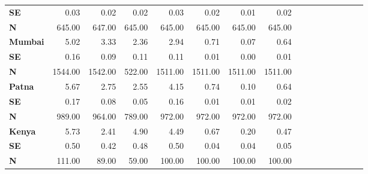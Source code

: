 \begin{tabular}{@{\extracolsep{5pt}}lrrrrrrrrrrrrrrr}
{\bf SE} & 0.03\phantom{***} & 0.02\phantom{***} & 0.02\phantom{***} & 0.03\phantom{***} & 0.02\phantom{***} & 0.01\phantom{***} & 0.02\phantom{***} \\
{\bf N} & 645.00\phantom{***} & 647.00\phantom{***} & 645.00\phantom{***} & 645.00\phantom{***} & 645.00\phantom{***} & 645.00\phantom{***} & 645.00\phantom{***} \\
{\bf Mumbai} & 5.02\phantom{***} & 3.33\phantom{***} & 2.36\phantom{***} & 2.94\phantom{***} & 0.71\phantom{***} & 0.07\phantom{***} & 0.64\phantom{***} \\
{\bf SE} & 0.16\phantom{***} & 0.09\phantom{***} & 0.11\phantom{***} & 0.11\phantom{***} & 0.01\phantom{***} & 0.00\phantom{***} & 0.01\phantom{***} \\
{\bf N} & 1544.00\phantom{***} & 1542.00\phantom{***} & 522.00\phantom{***} & 1511.00\phantom{***} & 1511.00\phantom{***} & 1511.00\phantom{***} & 1511.00\phantom{***} \\
{\bf Patna} & 5.67\phantom{***} & 2.75\phantom{***} & 2.55\phantom{***} & 4.15\phantom{***} & 0.74\phantom{***} & 0.10\phantom{***} & 0.64\phantom{***} \\
{\bf SE} & 0.17\phantom{***} & 0.08\phantom{***} & 0.05\phantom{***} & 0.16\phantom{***} & 0.01\phantom{***} & 0.01\phantom{***} & 0.02\phantom{***} \\
{\bf N} & 989.00\phantom{***} & 964.00\phantom{***} & 789.00\phantom{***} & 972.00\phantom{***} & 972.00\phantom{***} & 972.00\phantom{***} & 972.00\phantom{***} \\
{\bf Kenya} & 5.73\phantom{***} & 2.41\phantom{***} & 4.90\phantom{***} & 4.49\phantom{***} & 0.67\phantom{***} & 0.20\phantom{***} & 0.47\phantom{***} \\
{\bf SE} & 0.50\phantom{***} & 0.42\phantom{***} & 0.48\phantom{***} & 0.50\phantom{***} & 0.04\phantom{***} & 0.04\phantom{***} & 0.05\phantom{***} \\
{\bf N} & 111.00\phantom{***} & 89.00\phantom{***} & 59.00\phantom{***} & 100.00\phantom{***} & 100.00\phantom{***} & 100.00\phantom{***} & 100.00\phantom{***} \\
\hline
\end{tabular}
